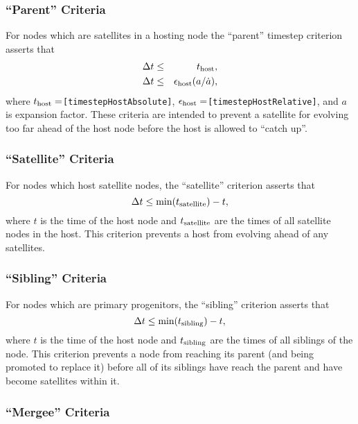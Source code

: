 \subsubsection{``Parent'' Criteria}

For \glspl{node} which are satellites in a hosting \gls{node} the ``\gls{parent}'' timestep criterion asserts that
\begin{eqnarray}
\Delta t &\le& t_{\rm host}, \\
\Delta t &\le& \epsilon_{\rm host} (a/\dot{a}),
\end{eqnarray}
where $t_{\rm host}=${\tt [timestepHostAbsolute]}, $\epsilon_{\rm host}=${\tt [timestepHostRelative]}, and $a$ is expansion factor. These criteria are intended to prevent a satellite for evolving too far ahead of the host node before the host is allowed to ``catch up''.

\subsubsection{``Satellite'' Criteria}

For \glspl{node} which host satellite \glspl{node}, the ``satellite'' criterion asserts that
\begin{equation}
 \Delta t \le \hbox{min}(t_{\rm satellite}) - t,
\end{equation}
where $t$ is the time of the host \gls{node} and $t_{\rm satellite}$ are the times of all satellite \glspl{node} in the host. This criterion prevents a host from evolving ahead of any satellites.

\subsubsection{``Sibling'' Criteria}

For \glspl{node} which are \glspl{primary progenitor}, the ``sibling'' criterion asserts that
\begin{equation}
 \Delta t \le \hbox{min}(t_{\rm sibling}) - t,
\end{equation}
where $t$ is the time of the host \gls{node} and $t_{\rm sibling}$ are the times of all siblings of the \gls{node}. This criterion prevents a \gls{node} from reaching its \gls{parent} (and being promoted to replace it) before all of its siblings have reach the \gls{parent} and have become satellites within it.

\subsubsection{``Mergee'' Criteria}

